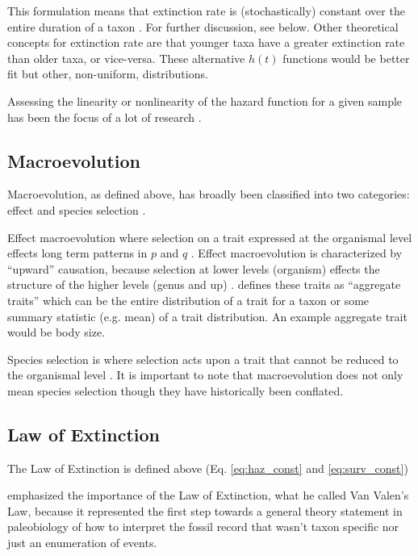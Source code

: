\documentclass[12pt,letterpaper]{article}
\begin{document}
This formulation means that extinction rate is (stochastically) constant over the entire duration of a taxon \citep{VanValen1973}. For further discussion, see below. Other theoretical concepts for extinction rate are that younger taxa have a greater extinction rate than older taxa, or vice-versa. These alternative \(h(t)\) functions would be better fit but other, non-uniform, distributions.

Assessing the linearity or nonlinearity of the hazard function for a given sample has been the focus of a lot of research \citep{Raup1975,Raup1978,Kitchell1991}.

\subsection{Macroevolution}
Macroevolution, as defined above, has broadly been classified into two categories: effect and species selection \citep{Jablonski2008a}. 

Effect macroevolution where selection on a trait expressed at the organismal level effects long term patterns in \(p\) and \(q\) \citep{Vrba1983,Jablonski2008a}. Effect macroevolution is characterized by ``upward'' causation, because selection at lower levels (organism) effects the structure of the higher levels (genus and up) \citep{Jablonski2008a}. \citet{Jablonski2008a} defines these traits as ``aggregate traits'' which can be the entire distribution of a trait for a taxon or some summary statistic (e.g. mean) of a trait distribution. An example aggregate trait would be body size. %

Species selection is where selection acts upon a trait that cannot be reduced to the organismal level \citep{Jablonski2007,Jablonski2008a}.
It is important to note that macroevolution does not only mean species selection \citep{Vrba1983} though they have historically been conflated.

\subsection{Law of Extinction}
The Law of Extinction is defined above (Eq. \ref{eq:haz_const} and \ref{eq:surv_const})

\citet{Raup1975} emphasized the importance of the Law of Extinction, what he called Van Valen's Law, because it represented the first step towards a general theory statement in paleobiology of how to interpret the fossil record that wasn't taxon specific nor just an enumeration of events.
\end{document}
